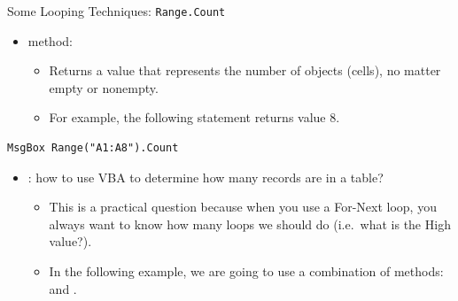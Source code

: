 \documentclass{beamer}
\begin{document}
\begin{frame}[fragile]{Some Looping Techniques: \texttt{Range.Count}}
\begin{itemize}
  \item {} method:
  \begin{itemize}
    \item Returns a value that represents the number of objects (cells), no matter empty or nonempty.
    \item For example, the following statement returns value 8.
  \end{itemize}
\end{itemize}
\begin{center}
\begin{minipage}{0.45\textwidth}
\begin{lstlisting}[language=VBA]
MsgBox Range("A1:A8").Count
\end{lstlisting}
\end{minipage}
\end{center}
\begin{itemize}
  \item {}: how to use VBA to determine how many
        records are in a table?
  \begin{itemize}
    \item This is a practical question because when you use a For-Next loop, you always want
          to know how many loops we should do (i.e.\ what is the High value?).
    \item In the following example, we are going to use a combination of methods:
           and .
  \end{itemize}
\end{itemize}
\end{frame}
\end{document}
